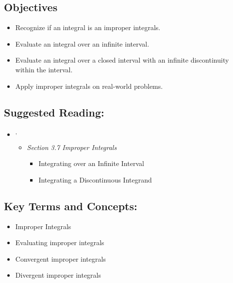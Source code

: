 
\vspace{-0.25 in}
\begin{framed}
\subsection*{Objectives}
\begin{itemize}
    \item Recognize if an integral is an improper integrals.
    \item Evaluate an integral over an infinite interval.
    \item Evaluate an integral over a closed interval with an infinite discontinuity within the interval. 
    \item Apply improper integrals on real-world problems.
\end{itemize}

\subsection*{Suggested Reading:}
\begin{itemize}

\item \cite{openstax}\footnotemark[1]\textsuperscript{,}\footnotemark[2]
    \begin{itemize}
        \item \emph{Section 3.7 Improper Integrals}
        \begin{itemize}
            \item Integrating over an Infinite Interval
            \item Integrating a Discontinuous Integrand
        \end{itemize}
    \end{itemize}

\end{itemize}
\subsection*{Key Terms and Concepts:} 

\begin{multicols}{2}
\begin{itemize}
    \item Improper Integrals
    \item Evaluating improper integrals
    \item Convergent improper integrals
    \item Divergent improper integrals
\end{itemize}
\end{multicols}
\end{framed}
